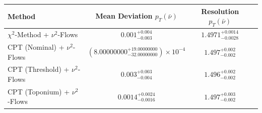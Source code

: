     \begin{tabular}{lccc}
        \toprule
        Method & Mean Deviation $p_{T}(\bar{\nu})$ & Resolution $p_{T}(\bar{\nu})$ \\
        \midrule
        $\chi^2$-Method + $\nu^2$-Flows & $0.001^{+0.004}_{-0.003}$ & $1.4971^{+0.0014}_{-0.0028}$ \\
        CPT (Nominal) + $\nu^2$-Flows & $(8.00000000^{+19.00000000}_{-32.00000000})\times 10^{-4}$ & $1.497^{+0.002}_{-0.002}$ \\
        CPT (Threshold) + $\nu^2$-Flows & $0.003^{+0.003}_{-0.004}$ & $1.496^{+0.002}_{-0.002}$ \\
        CPT (Toponium) + $\nu^2$-Flows & $0.0014^{+0.0024}_{-0.0016}$ & $1.497^{+0.003}_{-0.002}$ \\
        \bottomrule
    \end{tabular}